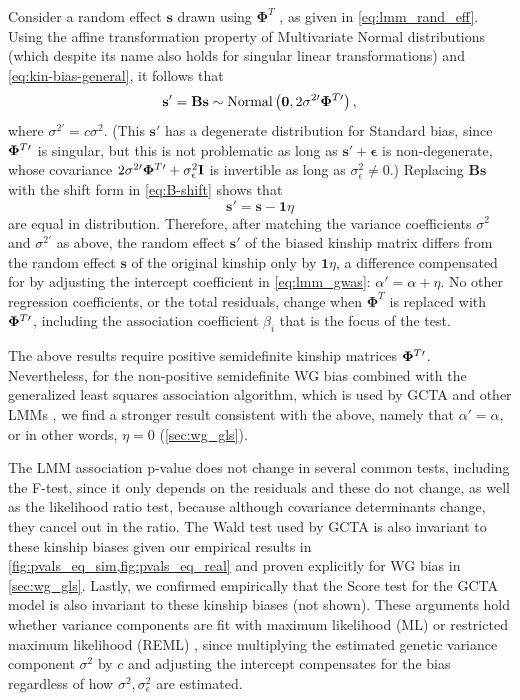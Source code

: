 \documentclass[11pt]{article}
\newcommand{\kinMat}[1][T]{%
  \ensuremath{%
    \mathbf{\Phi}^{#1}
  }%
  \xspace%
}%
\newcommand{\kinMatPrime}{%
  \ensuremath{%
    \mathbf{\Phi}^{T\prime}
  }%
  \xspace%
}%
\begin{document}
Consider a random effect $\mathbf{s}$ drawn using \kinMat, as given in \cref{eq:lmm_rand_eff}.
Using the affine transformation property of Multivariate Normal distributions (which despite its name also holds for singular linear transformations) and \cref{eq:kin-bias-general}, it follows that
$$
\mathbf{s}'
=
\mathbf{B} \mathbf{s}
\sim
\text{Normal} \left( \mathbf{0}, 2 \sigma^{2\prime} \kinMatPrime \right),
$$
where $\sigma^{2\prime} = c \sigma^2$.
(This $\mathbf{s}'$ has a degenerate distribution for Standard bias, since $\kinMatPrime$ is singular, but this is not problematic as long as $\mathbf{s}' + \boldsymbol{\epsilon}$ is non-degenerate, whose covariance $2 \sigma^{2\prime} \kinMatPrime + \sigma^2_\epsilon \mathbf{I}$ is invertible as long as $\sigma^2_\epsilon \ne 0$.)
Replacing $\mathbf{B} \mathbf{s}$ with the shift form in \cref{eq:B-shift} shows that
$$
\mathbf{s}' = \mathbf{s} - \mathbf{1} \eta
$$
are equal in distribution.
Therefore, after matching the variance coefficients $\sigma^2$ and $\sigma^{2\prime}$ as above, the random effect $\mathbf{s}'$ of the biased kinship matrix differs from the random effect $\mathbf{s}$ of the original kinship only by $\mathbf{1} \eta$, a difference compensated for by adjusting the intercept coefficient in \cref{eq:lmm_gwas}: $\alpha' = \alpha + \eta$.
No other regression coefficients, or the total residuals, change when \kinMat is replaced with $\kinMatPrime$, including the association coefficient $\beta_i$ that is the focus of the test.

The above results require positive semidefinite kinship matrices $\kinMatPrime$.
Nevertheless, for the non-positive semidefinite WG bias combined with the generalized least squares association algorithm, which is used by GCTA and other LMMs \citep{kang_efficient_2008, kang_variance_2010, yang_advantages_2014}, we find a stronger result consistent with the above, namely that $\alpha' = \alpha$, or in other words, $\eta = 0$ (\cref{sec:wg_gls}).

The LMM association p-value does not change in several common tests, including the F-test, since it only depends on the residuals and these do not change, as well as the likelihood ratio test, because although covariance determinants change, they cancel out in the ratio.
The Wald test used by GCTA \citep{yang_advantages_2014} is also invariant to these kinship biases given our empirical results in \cref{fig:pvals_eq_sim,fig:pvals_eq_real} and proven explicitly for WG bias in \cref{sec:wg_gls}.
Lastly, we confirmed empirically that the Score test for the GCTA model is also invariant to these kinship biases (not shown).
These arguments hold whether variance components are fit with maximum likelihood (ML) or restricted maximum likelihood (REML) \citep{kang_efficient_2008, kang_variance_2010, yang_advantages_2014}, since multiplying the estimated genetic variance component $\sigma^2$ by $c$ and adjusting the intercept compensates for the bias regardless of how $\sigma^2, \sigma^2_\epsilon$ are estimated.
\end{document}
